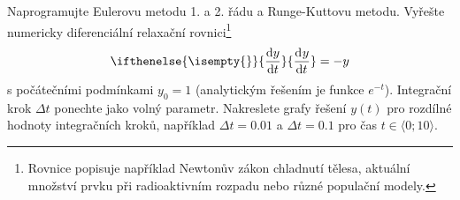 \documentclass[a4paper,11pt,twoside]{article}
\renewcommand{\d}{\mathrm{d}}           %
\newcommand{\derivative}[3][]{\ifthenelse{\isempty{#1}}	    %
	{\frac{\d{#2}}{\d{#3}}}
	{\frac{\d^{#1}{#2}}{\d{#3}^{#1}}}
}
\theoremstyle{red}
\theoremstyle{green}
\begin{document}
\begin{solved}
\label{task:ODR1}
    Naprogramujte Eulerovu metodu 1. a 2. řádu a Runge-Kuttovu metodu.
    Vyřešte numericky diferenciální relaxační rovnici\footnote{
        Rovnice popisuje například Newtonův zákon chladnutí tělesa, aktuální množství prvku při radioaktivním rozpadu nebo různé populační modely.
    }
    \begin{equation}\label{eq:relaxace}
        \derivative{y}{t}=-y
    \end{equation}
    s počátečními podmínkami $y_{0}=1$ (analytickým řešením je funkce $e^{-t}$).
    Integrační krok $\Delta t$ ponechte jako volný parametr.
    Nakreslete grafy řešení $y(t)$ pro rozdílné hodnoty integračních kroků, například $\Delta t=0.01$ a $\Delta t=0.1$ pro čas $t\in\langle0;10\rangle$.
\end{solved}
\end{document}
